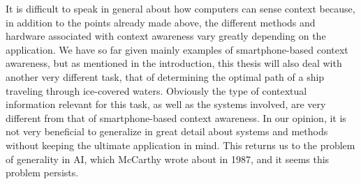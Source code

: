 It is difficult to speak in general about how computers can sense context because, in addition to the points already made above, the different methods and hardware associated with context awareness vary greatly depending on the application. We have so far given mainly examples of smartphone-based context awareness, but as mentioned in the introduction, this thesis will also deal with another very different task, that of determining the optimal path of a ship traveling through ice-covered waters. Obviously the type of contextual information relevant for this task, as well as the systems involved, are very different from that of smartphone-based context awareness. In our opinion, it is not very beneficial to generalize in great detail about systems and methods without keeping the ultimate application in mind. This returns us to the problem of generality in AI, which McCarthy wrote about in 1987, and it seems this problem persists.

